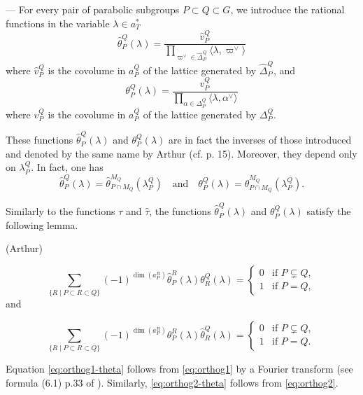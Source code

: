 \begin{paragr}\label{S:theta} --- For every pair of parabolic subgroups $P\subset Q\subset G$, we introduce the rational functions in the variable $\lambda\in a_T^*$
$$\hat{\theta}_P^Q(\lambda)=  \frac{\hat{v}_P^Q}{ \prod_{\varpi^\vee\in \hat{\Delta}_P^Q} \langle \lambda,\varpi^\vee \rangle } $$
where $\hat{v}_P^Q$ is the covolume in $a_P^Q$ of the lattice generated by  $\hat{\Delta}_P^Q$, and 
$$\theta_P^Q(\lambda)=  \frac{v_P^Q}{ \prod_{\alpha\in  \Delta_P^Q} \langle \lambda,\alpha^\vee \rangle } $$
where $v_P^Q$ is the covolume in $a_P^Q$ of the lattice generated by  $\Delta_P^Q$.

\begin{remarque}
  These functions $\hat{\theta}_P^Q(\lambda)$ and $\theta_P^Q(\lambda)$ are in fact the inverses of those introduced and denoted by the same name by Arthur (cf. \cite{trace_inv} p. 15). Moreover, they depend only on $\lambda_P^Q$. In fact, one has
  \begin{equation}
    \label{eq:desc-theta}
    \hat{\theta}_P^Q(\lambda)=\hat{\theta}_{P\cap M_Q}^{M_Q}(\lambda_P^Q) \quad \text{and} \quad \theta_P^Q(\lambda)=\theta_{P\cap M_Q}^{M_Q}(\lambda_P^Q).
  \end{equation}
\end{remarque}

Similarly to the functions $\tau$ and $\hat{\tau}$, the functions $\hat{\theta}_P^Q(\lambda)$ and $\theta_P^Q(\lambda)$ satisfy the following lemma.

\begin{lemme}\label{lem:tautau} (Arthur) 

\begin{equation}
  \label{eq:orthog1-theta}
\sum_{\{R \mid P\subset R\subset Q\}  } (-1)^{\dim(a_P^R)}\hat{\theta}_P^R(\lambda)  \theta_R^Q(\lambda)  =\begin{cases} 0 & \text{if } P \subsetneq Q, \\ 1 & \text{if } P= Q,
  \end{cases}
\end{equation}
and

\begin{equation}
  \label{eq:orthog2-theta}
\sum_{\{R \mid P\subset R\subset Q\}  } (-1)^{\dim(a_P^R)}\theta_P^R(\lambda)\hat{\theta}_R^Q(\lambda)=\begin{cases} 0 & \text{if } P \subsetneq Q, \\ 1 & \text{if } P= Q.
  \end{cases}
\end{equation}
\end{lemme}

\begin{preuve}
  Equation \eqref{eq:orthog1-theta} follows from \eqref{eq:orthog1} by a Fourier transform (see formula (6.1) p.33 of \cite{trace_inv}). Similarly, \eqref{eq:orthog2-theta} follows from \eqref{eq:orthog2}.
\end{preuve}

\end{paragr} 

